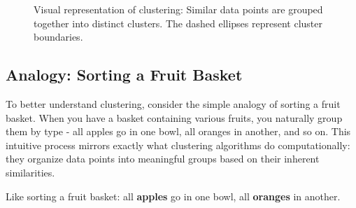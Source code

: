 \documentclass{article}
\begin{document}
\begin{figure}[H]
    \centering
    \caption{Visual representation of clustering: Similar data points are grouped together into distinct clusters. The dashed ellipses represent cluster boundaries.}
    \label{fig:clustering}
\end{figure}

\subsection{Analogy: Sorting a Fruit Basket}

To better understand clustering, consider the simple analogy of sorting a fruit basket. When you have a basket containing various fruits, you naturally group them by type - all apples go in one bowl, all oranges in another, and so on. This intuitive process mirrors exactly what clustering algorithms do computationally: they organize data points into meaningful groups based on their inherent similarities.

\begin{tcolorbox}[title=Analogy]
\centering
\large
Like sorting a fruit basket: all \textbf{apples} go in one bowl, all \textbf{oranges} in another.
\end{tcolorbox}
\end{document}
